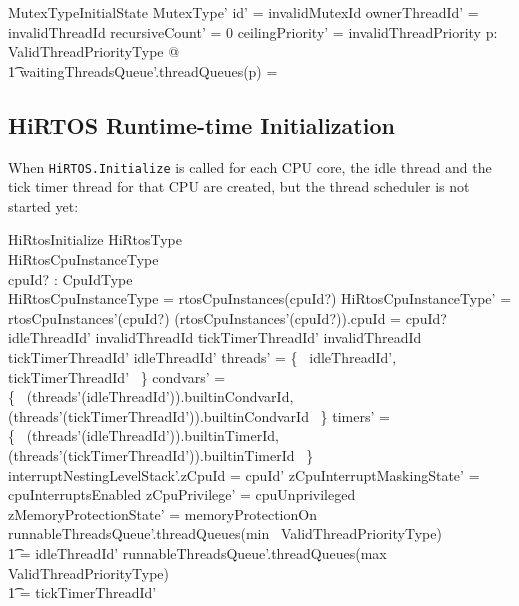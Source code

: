 \documentclass[11pt,letterpaper,twoside,openany]{book}
\begin{document}

\begin{schema}{MutexTypeInitialState}
   MutexType'
\where
  id' = invalidMutexId
\also
  ownerThreadId' = invalidThreadId
\also
  recursiveCount' = 0
\also
  ceilingPriority' = invalidThreadPriority
\also
   \forall p: ValidThreadPriorityType @ \\
\t1      waitingThreadsQueue'.threadQueues(p) = \emptyset
\end{schema}

\subsection{HiRTOS Runtime-time Initialization}
When \verb`HiRTOS.Initialize` is called for each CPU core, the idle thread
and the tick timer thread for that CPU are created, but the thread
scheduler is not started yet:

\begin{schema}{HiRtosInitialize}
   \Delta HiRtosType \\
   \Delta HiRtosCpuInstanceType \\
   cpuId? : CpuIdType \\
\where
   \theta HiRtosCpuInstanceType = rtosCpuInstances(cpuId?)
\also
   \theta HiRtosCpuInstanceType' = rtosCpuInstances'(cpuId?)
\also
   (rtosCpuInstances'(cpuId?)).cpuId = cpuId?
\also
    idleThreadId' \neq invalidThreadId
\also
    tickTimerThreadId' \neq invalidThreadId
\also
    tickTimerThreadId' \neq idleThreadId'
\also
    \dom threads' = \{~ idleThreadId', tickTimerThreadId' ~\}
\also
    \dom condvars' = \\
   \{~ (threads'(idleThreadId')).builtinCondvarId, \\
      (threads'(tickTimerThreadId')).builtinCondvarId ~\}
\also
    \dom timers' = \\
   \{~ (threads'(idleThreadId')).builtinTimerId, \\
       (threads'(tickTimerThreadId')).builtinTimerId ~\}
\also
   interruptNestingLevelStack'.zCpuId = cpuId'
\also
    zCpuInterruptMaskingState' = cpuInterruptsEnabled
\also
    zCpuPrivilege' = cpuUnprivileged
\also
    zMemoryProtectionState' = memoryProtectionOn
\also
    runnableThreadsQueue'.threadQueues(min~ ValidThreadPriorityType) \\
    \t1 = \langle idleThreadId' \rangle
\also
    runnableThreadsQueue'.threadQueues(max~ ValidThreadPriorityType) \\
    \t1 = \langle tickTimerThreadId' \rangle
\end{schema}
\end{document}
